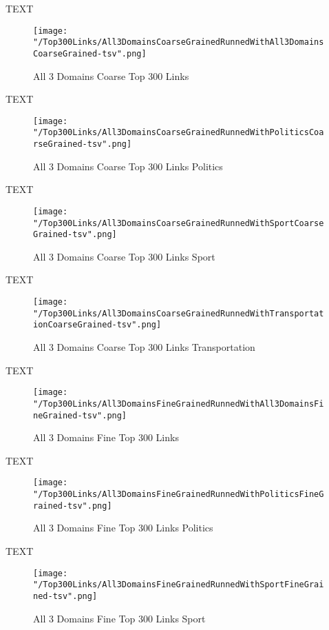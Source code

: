 \documentclass[thesis=M,english]{FITthesis}[2012/10/20]
\begin{document}
	TEXT

	\begin{figure}\centering
		\texttt{[image: "/Top300Links/All3DomainsCoarseGrainedRunnedWithAll3DomainsCoarseGrained-tsv".png]}
		\caption{All 3 Domains Coarse Top 300 Links}\label{}
	\end{figure}

	TEXT

	\begin{figure}\centering
		\texttt{[image: "/Top300Links/All3DomainsCoarseGrainedRunnedWithPoliticsCoarseGrained-tsv".png]}
		\caption{All 3 Domains Coarse Top 300 Links Politics}\label{}
	\end{figure}	

	TEXT	

	\begin{figure}\centering
		\texttt{[image: "/Top300Links/All3DomainsCoarseGrainedRunnedWithSportCoarseGrained-tsv".png]}
		\caption{All 3 Domains Coarse Top 300 Links Sport}\label{}
	\end{figure}
	
		TEXT	

	\begin{figure}\centering
		\texttt{[image: "/Top300Links/All3DomainsCoarseGrainedRunnedWithTransportationCoarseGrained-tsv".png]}
		\caption{All 3 Domains Coarse Top 300 Links Transportation}\label{}	
	\end{figure}
		
		TEXT	

	\begin{figure}\centering
		\texttt{[image: "/Top300Links/All3DomainsFineGrainedRunnedWithAll3DomainsFineGrained-tsv".png]}
		\caption{All 3 Domains Fine Top 300 Links }\label{}	
	\end{figure}
	
	TEXT

	\begin{figure}\centering
		\texttt{[image: "/Top300Links/All3DomainsFineGrainedRunnedWithPoliticsFineGrained-tsv".png]}
		\caption{All 3 Domains Fine Top 300 Links Politics}\label{}
	\end{figure}	

	TEXT	

	\begin{figure}\centering
		\texttt{[image: "/Top300Links/All3DomainsFineGrainedRunnedWithSportFineGrained-tsv".png]}
		\caption{All 3 Domains Fine Top 300 Links Sport}\label{}
	\end{figure}
	
\end{document}

